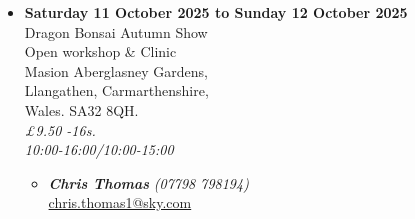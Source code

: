 \begin{itemize}
    \emph{Gordon Duffett} \\
    \emph{Grain Of Time Ceramics} \\
    \emph{Greenwood Bonsai} \\
    \emph{Hadori Bonsai} \\
    \emph{Hereward Trees} \\
    \emph{House Of British Bonsai \& Yamadori} \\
    \emph{LV Bonsai} \\
    \emph{Mark Beverton Furniture} \\
    \emph{Mendip Bonsai} \\
    \emph{Oakfield Bonsai Supplies} \\
    \emph{Oceana} \\
    \emph{Shohin-Bonsai} \\
    \emph{Spectre Ceramics} \\
    \emph{Springwood Ceramics} \\
    \emph{Suteki} \\
    \emph{UK Bonsai Tables} \\
    \emph{Walsall Studio Ceramics} \\
    \emph{Windybank Bonsai} \\
    \emph{Woodandclay} \\
    \emph{Zac's Bonsai} \\
    \emph{Zenwurzel Woodcrafts}
    \\
    \href{http://www.heathrowbonsai.weebly.com/}{www.heathrowbonsai.weebly.com}
    \begin{itemize}
        \item \textbf{\emph{Mark Moreland}} \emph{(07850 771201)} \\
        \href{mailto:ukbonsaiassociation@gmail.com}{ukbonsaiassociation@gmail.com} 
    \end{itemize}

    \item \textbf{Saturday 11 October 2025 to Sunday 12 October 2025}
    \\
    Dragon Bonsai Autumn Show \\
    Open workshop \& Clinic \\
    Masion Aberglasney Gardens, \\
    Llangathen, Carmarthenshire, \\
    Wales. SA32 8QH.
    \\
    \emph{£9.50 -16s.} \\
    \emph{10:00-16:00/10:00-15:00}
    \begin{itemize}
        \item \textbf{\emph{Chris Thomas}} \emph{(07798 798194)} \\
        \href{mailto:chris.thomas1@sky.com}{chris.thomas1@sky.com} 
    \end{itemize}


\end{itemize}
